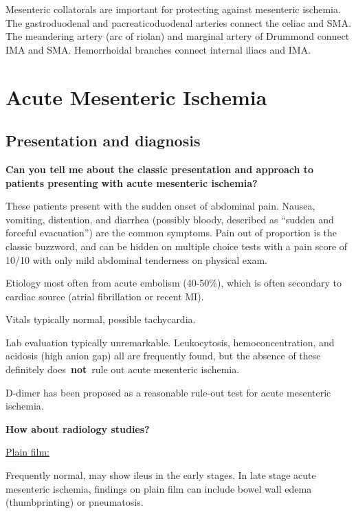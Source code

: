 \documentclass[
]{book}
\begin{document}
Mesenteric collatorals are important for protecting against mesenteric
ischemia. The gastroduodenal and pacreaticoduodenal arteries connect the
celiac and SMA. The meandering artery (arc of riolan) and marginal
artery of Drummond connect IMA and SMA. Hemorrhoidal branches connect
internal iliacs and IMA. \citep{chandraChronicMesentericIschemia2010, vangulikAnastomosisRiolanRevisited2005}

\hypertarget{acute-mesenteric-ischemia}{%
\section{Acute Mesenteric Ischemia}\label{acute-mesenteric-ischemia}}

\hypertarget{presentation-and-diagnosis-1}{%
\subsection{Presentation and diagnosis}\label{presentation-and-diagnosis-1}}

\textbf{Can you tell me about the classic presentation and approach to
patients presenting with acute mesenteric ischemia?}

These patients present with the sudden onset of abdominal pain. Nausea,
vomiting, distention, and diarrhea (possibly bloody, described as
``sudden and forceful evacuation'') are the common symptoms. Pain out of
proportion is the classic buzzword, and can be hidden on multiple choice
tests with a pain score of 10/10 with only mild abdominal tenderness on
physical exam.

Etiology most often from acute embolism (40-50\%), which is often
secondary to cardiac source (atrial fibrillation or recent
MI).\citep{wyersmarkcandmartin133AcuteMesenteric2019}

Vitals typically normal, possible tachycardia.

Lab evaluation typically unremarkable. Leukocytosis, hemoconcentration,
and acidosis (high anion gap) all are frequently found, but the absence
of these definitely does~\textbf{not}~rule out acute mesenteric ischemia.

D-dimer has been proposed as a reasonable rule-out test for acute
mesenteric ischemia.

\textbf{How about radiology studies?}

\underline{Plain film:}

Frequently normal, may show ileus in the early stages. In late stage
acute mesenteric ischemia, findings on plain film can include bowel wall
edema (thumbprinting) or pneumatosis.
\end{document}
